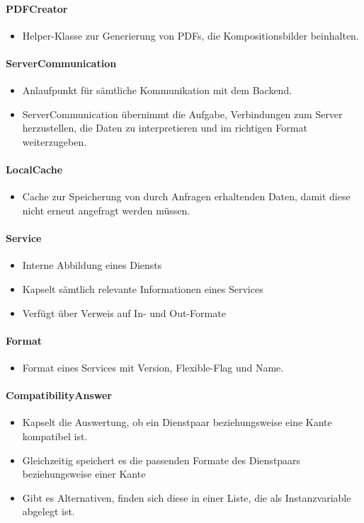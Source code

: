 \paragraph{PDFCreator}
\begin{itemize}
	\item Helper-Klasse zur Generierung von PDFs, die Kompositionsbilder beinhalten. 
\end{itemize}

\paragraph{ServerCommunication}
\begin{itemize} 
	\item Anlaufpunkt für sämtliche Kommunikation mit dem Backend. 
	\item ServerCommunication übernimmt die Aufgabe, Verbindungen zum Server herzustellen, die Daten zu interpretieren und im richtigen Format weiterzugeben. 
\end{itemize}
\paragraph{LocalCache}
\begin{itemize} 
	\item Cache zur Speicherung von durch Anfragen erhaltenden Daten, damit diese nicht erneut angefragt werden müssen. 
\end{itemize}
\paragraph{Service}
\begin{itemize} 
	\item Interne Abbildung eines Diensts
	\item Kapselt sämtlich relevante Informationen eines Services
	\item Verfügt über Verweis auf In- und Out-Formate
\end{itemize}
\paragraph{Format}
\begin{itemize}	
	\item Format eines Services mit Version, Flexible-Flag und Name.
\end{itemize}
\paragraph{CompatibilityAnswer}
\begin{itemize}
	\item Kapselt die Auswertung, ob ein Dienstpaar beziehungsweise eine Kante kompatibel ist. 
	\item Gleichzeitig speichert es die passenden Formate des Dienstpaars beziehungsweise einer Kante
	\item Gibt es Alternativen, finden sich diese in einer Liste, die als Instanzvariable abgelegt ist.
\end{itemize}

